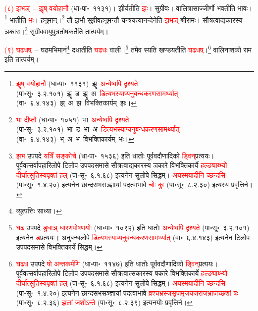 \begin{sloppypar}\justifying\noindent\hspace{10mm} \textcolor{red}{(८) झभञ्}~– \textcolor{red}{झॄष् वयो\-हानौ} (धा॰पा॰~११३१)। झीर्यतीति \textcolor{red}{झः}। सुग्रीवः। वालि\-त्रासाज्जीर्णो भवतीति भावः।\footnote{\textcolor{red}{झॄष् वयो\-हानौ} (धा॰पा॰~११३१)~\arrow झॄ~\arrow \textcolor{red}{अन्येष्वपि दृश्यते} (पा॰सू॰~३.२.१०१)~\arrow झॄ~ड~\arrow झॄ~अ~\arrow \textcolor{red}{डित्यभस्याप्यनु\-बन्धकरण\-सामर्थ्यात्} (वा॰~६.४.१४३)~\arrow झ्~अ~\arrow झ~\arrow विभक्तिकार्यम्~\arrow झः।} भातीति \textcolor{red}{भः}। हनुमान्।\footnote{\textcolor{red}{भा दीप्तौ} (धा॰पा॰~१०५१)~\arrow भा~\arrow \textcolor{red}{अन्येष्वपि दृश्यते} (पा॰सू॰~३.२.१०१)~\arrow भा~ड~\arrow भा~अ~\arrow \textcolor{red}{डित्यभस्याप्यनु\-बन्धकरण\-सामर्थ्यात्} (वा॰~६.४.१४३)~\arrow भ्~अ~\arrow भ~\arrow विभक्तिकार्यम्~\arrow भः।} तौ झभौ सुग्रीव\-हनुमन्तौ यन्त्रयत्यानन्देनेति \textcolor{red}{झभञ्} श्रीरामः। सौत्रत्वाद्यकारस्य ञकारः।\footnote{\textcolor{red}{झभ} उपपदे \textcolor{red}{यत्रिँ सङ्कोचे} (धा॰पा॰~१५३६) इति धातोः पूर्ववदौणादिको \textcolor{red}{ड्विन्‌}\-प्रत्ययः। पूर्ववत्सर्वापहारि\-लोपे टिलोप उपपद\-समासे सौत्रत्वाद्यकारस्य ञकारे विभक्ति\-कार्ये \textcolor{red}{हल्ङ्याब्भ्यो दीर्घात्सुतिस्यपृक्तं हल्} (पा॰सू॰~६.१.६८) इत्यनेन सुलोपे सिद्धम्। \textcolor{red}{अयस्मयादीनि च्छन्दसि} (पा॰सू॰~१.४.२०) इत्यनेन छान्दस\-भसञ्ज्ञायां पदत्वाभावे \textcolor{red}{चोः कुः} (पा॰सू॰~८.२.३०) इत्यस्य प्रवृत्तिर्न।} सुग्रीव\-वायु\-पुत्र\-तोष\-कर्तेति तात्पर्यम्।\end{sloppypar}
\begin{sloppypar}\justifying\noindent\hspace{10mm} \textcolor{red}{(९) घढधष्}~– घढमभिमानं\footnote{व्युत्पत्तिः साध्या।} दधातीति \textcolor{red}{घढधः} वाली।\footnote{\textcolor{red}{घढ} उपपदे \textcolor{red}{डुधाञ् धारण\-पोषणयोः} (धा॰पा॰~१०९२) इति धातोः \textcolor{red}{अन्येष्वपि दृश्यते} (पा॰सू॰~३.२.१०१) इत्यनेन \textcolor{red}{ड}\-प्रत्ययः। अनुबन्ध\-लोपे \textcolor{red}{डित्यभस्याप्यनु\-बन्धकरण\-सामर्थ्यात्} (वा॰~६.४.१४३) इत्यनेन टिलोप उपपदसमासे विभक्तिकार्ये सिद्धम्।} तमेव स्यति खण्डयतीति \textcolor{red}{घढधष्}।\footnote{\textcolor{red}{घढध} उपपदे \textcolor{red}{षो अन्तकर्मणि} (धा॰पा॰~११४७) इति धातोः पूर्ववदौणादिको \textcolor{red}{ड्विन्‌}\-प्रत्ययः। पूर्ववत्सर्वापहारि\-लोपे टिलोप उपपद\-समासे सौत्रत्वात्सकारस्य षकारे विभक्ति\-कार्ये \textcolor{red}{हल्ङ्याब्भ्यो दीर्घात्सुतिस्यपृक्तं हल्} (पा॰सू॰~६.१.६८) इत्यनेन सुलोपे सिद्धम्। \textcolor{red}{अयस्मयादीनि च्छन्दसि} (पा॰सू॰~१.४.२०) इत्यनेन छान्दस\-भसञ्ज्ञायां पदत्वाभावे \textcolor{red}{व्रश्चभ्रस्ज\-सृजमृज\-यजराज\-भ्राजच्छशां षः} (पा॰सू॰~८.२.३६) \textcolor{red}{झलां जशोऽन्ते} (पा॰सू॰~८.२.३९) इत्यनयोः प्रवृत्तिर्न।} वालि\-नाशको राम इति तात्पर्यम्।\end{sloppypar}
